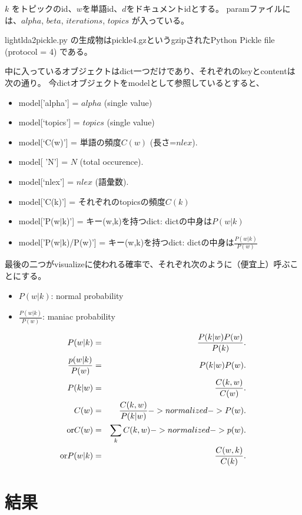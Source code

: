 \documentclass[uplatex,dvipdfmx,fleqn]{jsarticle}
\begin{document}
$k$ をトピックのid、$w$を単語id、$d$をドキュメントidとする。
paramファイルには、$alpha$, $beta$, $iterations$, $topics$ が入っている。

lightlda2pickle.py の生成物はpickle4.gzというgzipされたPython Pickle file (protocol = 4)
である。

中に入っているオブジェクトはdict一つだけであり、それぞれのkeyとcontentは次の通り。
今dictオブジェクトをmodelとして参照しているとすると、
　
\begin{itemize}
\item model['alpha'] = $alpha$ (single value)
\item model[‘topics’] = $topics$ (single value)
\item model[‘C(w)’] = 単語の頻度$C(w)$ (長さ=$nlex$).
\item	model[ ’N’] = $N$ (total occurence).
\item model[‘nlex'] = $nlex$ (語彙数).
\item model[’C(k)’] = それぞれのtopicsの頻度$C(k)$
\item	model[’P(w$|$k)’] =  キー(w,k)を持つdict: dictの中身は$P(w|k)$
\item model[’P(w$|$k)/P(w)’] = キー(w,k)を持つdict: dictの中身は$\displaystyle\frac{P(w|k)}{P(w)}$
\end{itemize}

最後の二つがvisualizeに使われる確率で、それぞれ次のように（便宜上）呼ぶことにする。

\begin{itemize}
\item	$P(w|k)$: normal probability
\item $\displaystyle\frac{P(w|k)}{P(w)}$: maniac probability
\end{itemize}

\begin{eqnarray}
P(w|k) & = & \frac{P(k|w)P(w)}{P(k)}. \\
\frac{p(w|k)}{P(w)} & = & P(k|w)P(w). \\
P(k|w) & = & \frac{C(k,w)}{C(w)}. \\
C(w) & = & \frac{C(k,w)}{P(k|w)} -> normalized -> P(w). \\
\mbox{or}\/ C(w) & = & \sum_k C(k,w) -> normalized -> p(w). \\ 
\mbox{or}\/ P(w|k) & = & \frac{C(w,k)}{C(k)}.\\
\end{eqnarray}

\section{結果}
\end{document}
